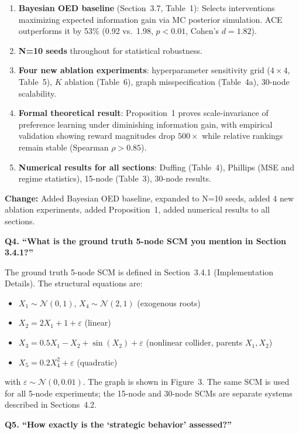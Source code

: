 \documentclass[11pt]{article}
\newcommand{\reviewer}[1]{\vspace{0.8em}\noindent\textbf{\textcolor{reviewercolor}{#1}}}
\newcommand{\response}{\vspace{0.3em}\noindent\textcolor{responsecolor}}
\newcommand{\change}[1]{\textcolor{changecolor}{\textbf{Change:} #1}}
\begin{document}
\begin{enumerate}[nosep]
\item \textbf{Bayesian OED baseline} (Section~3.7, Table~1): Selects interventions maximizing expected information gain via MC posterior simulation. ACE outperforms it by 53\% (0.92 vs.\ 1.98, $p < 0.01$, Cohen's $d = 1.82$).
\item \textbf{N=10 seeds} throughout for statistical robustness.
\item \textbf{Four new ablation experiments}: hyperparameter sensitivity grid ($4 \times 4$, Table~5), $K$ ablation (Table~6), graph misspecification (Table~4a), 30-node scalability.
\item \textbf{Formal theoretical result}: Proposition~1 proves scale-invariance of preference learning under diminishing information gain, with empirical validation showing reward magnitudes drop $500\times$ while relative rankings remain stable (Spearman $\rho > 0.85$).
\item \textbf{Numerical results for all sections}: Duffing (Table~4), Phillips (MSE and regime statistics), 15-node (Table~3), 30-node results.
\end{enumerate}

\change{Added Bayesian OED baseline, expanded to N=10 seeds, added 4 new ablation experiments, added Proposition~1, added numerical results to all sections.}

\reviewer{Q4. ``What is the ground truth 5-node SCM you mention in Section 3.4.1?''}

\response The ground truth 5-node SCM is defined in Section~3.4.1 (Implementation Details). The structural equations are:
\begin{itemize}[nosep]
\item $X_1 \sim \mathcal{N}(0, 1)$, $X_4 \sim \mathcal{N}(2, 1)$ \hfill (exogenous roots)
\item $X_2 = 2X_1 + 1 + \varepsilon$ \hfill (linear)
\item $X_3 = 0.5X_1 - X_2 + \sin(X_2) + \varepsilon$ \hfill (nonlinear collider, parents $X_1, X_2$)
\item $X_5 = 0.2X_4^2 + \varepsilon$ \hfill (quadratic)
\end{itemize}
with $\varepsilon \sim \mathcal{N}(0, 0.01)$. The graph is shown in Figure~3. The same SCM is used for all 5-node experiments; the 15-node and 30-node SCMs are separate systems described in Sections~4.2.

\reviewer{Q5. ``How exactly is the `strategic behavior' assessed?''}
\end{document}
